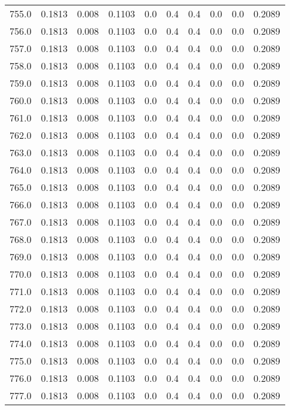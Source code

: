 \begin{longtable}{lrrrrrrrrr}
755.0 & 0.1813 & 0.008 & 0.1103 & 0.0 & 0.4 & 0.4 & 0.0 & 0.0 & 0.2089 \\
756.0 & 0.1813 & 0.008 & 0.1103 & 0.0 & 0.4 & 0.4 & 0.0 & 0.0 & 0.2089 \\
757.0 & 0.1813 & 0.008 & 0.1103 & 0.0 & 0.4 & 0.4 & 0.0 & 0.0 & 0.2089 \\
758.0 & 0.1813 & 0.008 & 0.1103 & 0.0 & 0.4 & 0.4 & 0.0 & 0.0 & 0.2089 \\
759.0 & 0.1813 & 0.008 & 0.1103 & 0.0 & 0.4 & 0.4 & 0.0 & 0.0 & 0.2089 \\
760.0 & 0.1813 & 0.008 & 0.1103 & 0.0 & 0.4 & 0.4 & 0.0 & 0.0 & 0.2089 \\
761.0 & 0.1813 & 0.008 & 0.1103 & 0.0 & 0.4 & 0.4 & 0.0 & 0.0 & 0.2089 \\
762.0 & 0.1813 & 0.008 & 0.1103 & 0.0 & 0.4 & 0.4 & 0.0 & 0.0 & 0.2089 \\
763.0 & 0.1813 & 0.008 & 0.1103 & 0.0 & 0.4 & 0.4 & 0.0 & 0.0 & 0.2089 \\
764.0 & 0.1813 & 0.008 & 0.1103 & 0.0 & 0.4 & 0.4 & 0.0 & 0.0 & 0.2089 \\
765.0 & 0.1813 & 0.008 & 0.1103 & 0.0 & 0.4 & 0.4 & 0.0 & 0.0 & 0.2089 \\
766.0 & 0.1813 & 0.008 & 0.1103 & 0.0 & 0.4 & 0.4 & 0.0 & 0.0 & 0.2089 \\
767.0 & 0.1813 & 0.008 & 0.1103 & 0.0 & 0.4 & 0.4 & 0.0 & 0.0 & 0.2089 \\
768.0 & 0.1813 & 0.008 & 0.1103 & 0.0 & 0.4 & 0.4 & 0.0 & 0.0 & 0.2089 \\
769.0 & 0.1813 & 0.008 & 0.1103 & 0.0 & 0.4 & 0.4 & 0.0 & 0.0 & 0.2089 \\
770.0 & 0.1813 & 0.008 & 0.1103 & 0.0 & 0.4 & 0.4 & 0.0 & 0.0 & 0.2089 \\
771.0 & 0.1813 & 0.008 & 0.1103 & 0.0 & 0.4 & 0.4 & 0.0 & 0.0 & 0.2089 \\
772.0 & 0.1813 & 0.008 & 0.1103 & 0.0 & 0.4 & 0.4 & 0.0 & 0.0 & 0.2089 \\
773.0 & 0.1813 & 0.008 & 0.1103 & 0.0 & 0.4 & 0.4 & 0.0 & 0.0 & 0.2089 \\
774.0 & 0.1813 & 0.008 & 0.1103 & 0.0 & 0.4 & 0.4 & 0.0 & 0.0 & 0.2089 \\
775.0 & 0.1813 & 0.008 & 0.1103 & 0.0 & 0.4 & 0.4 & 0.0 & 0.0 & 0.2089 \\
776.0 & 0.1813 & 0.008 & 0.1103 & 0.0 & 0.4 & 0.4 & 0.0 & 0.0 & 0.2089 \\
777.0 & 0.1813 & 0.008 & 0.1103 & 0.0 & 0.4 & 0.4 & 0.0 & 0.0 & 0.2089 \\

\end{longtable}
